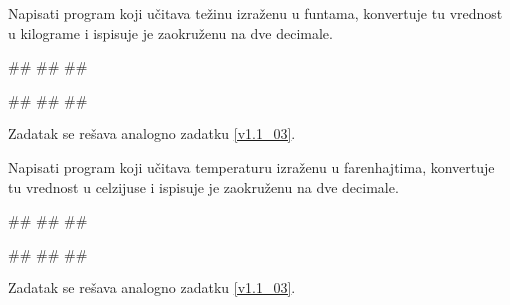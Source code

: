 \begin{Exercise}[label=p1.1_10b] 
Napisati program koji učitava težinu izraženu
   u funtama, konvertuje tu vrednost u kilograme i ispisuje je zaokruženu na dve decimale. 

\begin{miditest}
\begin{upotreba}{1}
#\naslovInt#
##
##
\end{upotreba}
\end{miditest}  
\begin{miditest}
\begin{upotreba}{2}
#\naslovInt#
##
##
\end{upotreba}
\end{miditest}   
\end{Exercise}
\ifresenja
\begin{Answer}[ref=p1.1_10b]
Zadatak se rešava analogno zadatku \ref{v1.1_03}.
\end{Answer}
\fi


\begin{Exercise}[label=p1.1_10c] 
Napisati program koji učitava temperaturu izraženu
   u farenhajtima, konvertuje tu vrednost u celzijuse i ispisuje je zaokruženu na dve decimale. 
   
\begin{miditest}
\begin{upotreba}{1}
#\naslovInt#
##
##
\end{upotreba}
\end{miditest}  
\begin{miditest}
\begin{upotreba}{2}
#\naslovInt#
##
##
\end{upotreba}
\end{miditest}
\end{Exercise}
\ifresenja
\begin{Answer}[ref=p1.1_10c]
Zadatak se rešava analogno zadatku \ref{v1.1_03}.
\end{Answer}
\fi





